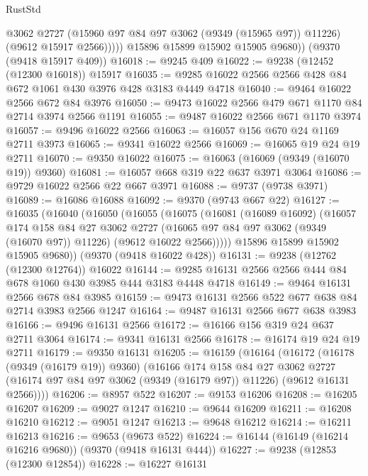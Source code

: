 \begin{lexlean}{RustStd}
\begin{coremodule}
                @3062
                @2727
                (@15960 @97 @84 @97 @3062 (@9349 (@15965 @97)) @11226)
                (@9612 @15917 @2566)))))
        @15896
        @15899
        @15902
        @15905
        @9680))
    (@9370 (@9418 @15917 @409))
@16018 := @9245 @409
@16022 := @9238 (@12452 (@12300 @16018)) @15917
@16035 := @9285 @16022 @2566 @2566 @428 @84 @672 @1061 @430 @3976 @428 @3183 @4449 @4718
@16040 := @9464 @16022 @2566 @672 @84 @3976
@16050 := @9473 @16022 @2566 @479 @671 @1170 @84 @2714 @3974 @2566 @1191
@16055 := @9487 @16022 @2566 @671 @1170 @3974
@16057 := @9496 @16022 @2566
@16063 := @16057 @156 @670 @24 @1169 @2711 @3973
@16065 := @9341 @16022 @2566
@16069 := @16065 @19 @24 @19 @2711
@16070 := @9350 @16022
@16075 := @16063 (@16069 (@9349 (@16070 @19)) @9360)
@16081 := @16057 @668 @319 @22 @637 @3971 @3064
@16086 := @9729 @16022 @2566 @22 @667 @3971
@16088 := @9737 (@9738 @3971)
@16089 := @16086 @16088
@16092 := @9370 (@9743 @667 @22)
@16127 := @16035
    (@16040
      (@16050
        (@16055
          (@16075
            (@16081
              (@16089 @16092)
              (@16057
                @174
                @158
                @84
                @27
                @3062
                @2727
                (@16065 @97 @84 @97 @3062 (@9349 (@16070 @97)) @11226)
                (@9612 @16022 @2566)))))
        @15896
        @15899
        @15902
        @15905
        @9680))
    (@9370 (@9418 @16022 @428))
@16131 := @9238 (@12762 (@12300 @12764)) @16022
@16144 := @9285 @16131 @2566 @2566 @444 @84 @678 @1060 @430 @3985 @444 @3183 @4448 @4718
@16149 := @9464 @16131 @2566 @678 @84 @3985
@16159 := @9473 @16131 @2566 @522 @677 @638 @84 @2714 @3983 @2566 @1247
@16164 := @9487 @16131 @2566 @677 @638 @3983
@16166 := @9496 @16131 @2566
@16172 := @16166 @156 @319 @24 @637 @2711 @3064
@16174 := @9341 @16131 @2566
@16178 := @16174 @19 @24 @19 @2711
@16179 := @9350 @16131
@16205 := @16159
    (@16164
      (@16172
        (@16178 (@9349 (@16179 @19)) @9360)
        (@16166
          @174
          @158
          @84
          @27
          @3062
          @2727
          (@16174 @97 @84 @97 @3062 (@9349 (@16179 @97)) @11226)
          (@9612 @16131 @2566))))
@16206 := @8957 @522
@16207 := @9153 @16206
@16208 := @16205 @16207
@16209 := @9027 @1247
@16210 := @9644 @16209
@16211 := @16208 @16210
@16212 := @9051 @1247
@16213 := @9648 @16212
@16214 := @16211 @16213
@16216 := @9653 (@9673 @522)
@16224 := @16144 (@16149 (@16214 @16216 @9680)) (@9370 (@9418 @16131 @444))
@16227 := @9238 (@12853 (@12300 @12854))
@16228 := @16227 @16131

\end{coremodule}
\end{lexlean}
